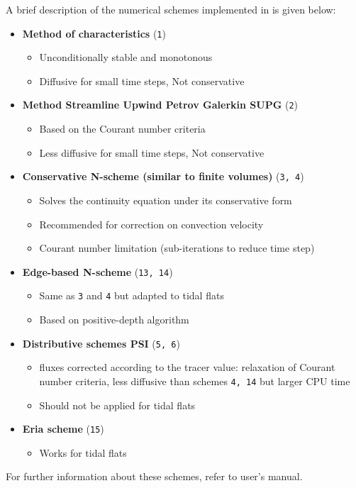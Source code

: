 A brief description of the numerical schemes implemented in \gaia{} is given below:
\begin{itemize}
\item \textbf{Method of characteristics} (\texttt{1})
\begin{itemize}
\item Unconditionally stable and monotonous
\item Diffusive for small time steps, Not conservative
\end{itemize}
\item \textbf{Method Streamline Upwind Petrov Galerkin SUPG} (\texttt{2})
\begin{itemize}
\item Based on the Courant number criteria
\item Less diffusive for small time steps, Not conservative
\end{itemize}
\item \textbf{Conservative N-scheme (similar to finite volumes)} (\texttt{3, 4})
\begin{itemize}
\item Solves the continuity equation under its conservative form
\item Recommended for correction on convection velocity
\item Courant number limitation (sub-iterations to reduce time step)
\end{itemize}
\item \textbf{Edge-based N-scheme} (\texttt{13, 14})
\begin{itemize}
\item Same as \texttt{3} and \texttt{4} but adapted to tidal flats
\item Based on positive-depth algorithm
\end{itemize}
\item \textbf{Distributive schemes PSI} (\texttt{5, 6})
\begin{itemize}
\item fluxes corrected according to the tracer value: relaxation of Courant number criteria, less diffusive than
schemes \texttt{4, 14} but larger CPU time
\item Should not be applied for tidal flats
\end{itemize}
\item \textbf{Eria scheme} (\texttt{15})
\begin{itemize}
\item Works for tidal flats
\end{itemize}
\end{itemize}
For further information about these schemes, refer to  user's manual.


